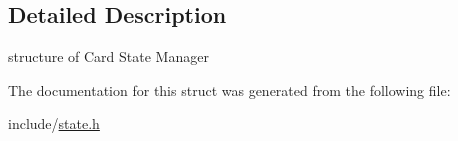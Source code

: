 \subsection{Detailed Description}
structure of Card State Manager 

The documentation for this struct was generated from the following file\-:\begin{DoxyCompactItemize}
\item 
include/\hyperlink{state_8h}{state.\-h}\end{DoxyCompactItemize}
